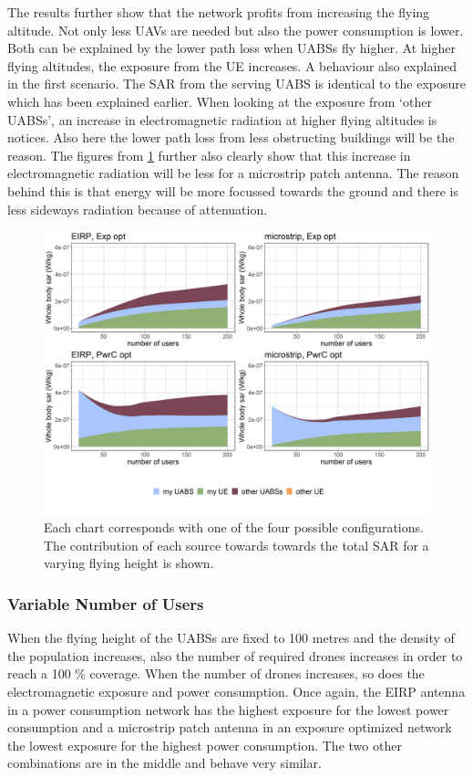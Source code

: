 \documentclass[twocolumn]{phdsymp} %
\begin{document}
The results further show that the network profits from increasing the flying altitude. Not only
less \gls{UAV}s are needed but also the power consumption is lower. Both can be explained by the
lower path loss when UABSs fly higher. At higher flying altitudes, 
the exposure from the \gls{UE} increases. A behaviour also explained in the first scenario.
The SAR from the serving \gls{UABS} is identical to the exposure which has been explained earlier.
When looking at the exposure from `other \gls{UABS}s', an increase in electromagnetic radiation at higher 
flying altitudes is notices.
Also here the lower path loss from less obstructing buildings will be the reason.
The figures from \ref{fig:s3a_fourSourcesMatrix} further also clearly show that this increase 
in electromagnetic radiation will be less for a microstrip patch antenna. The reason behind this is that energy 
will be more focussed towards the ground and there is less sideways radiation because of attenuation.

\begin{figure}[h!]
  \includegraphics[width=\linewidth]{../results/s3/fhFourSources.png}
  \caption{Each chart corresponds with one of the four possible configurations. The contribution of each source towards towards the total 
  \gls{SAR} for a varying flying height is shown.}
  \label{fig:s3a_fourSourcesMatrix}
\end{figure}

\subsubsection{Variable Number of Users}
When the flying height of the \gls{UABS}s are fixed to 100 metres and the density of the population increases, also 
the number of required drones increases in order to reach a 100 \% coverage. When the number of drones increases, 
so does the electromagnetic exposure and power consumption.
Once again, the EIRP antenna in a power consumption network has the highest exposure for the lowest power consumption
and a microstrip patch antenna in an exposure optimized network the lowest exposure for the highest power consumption.
The two other combinations are in the middle and behave very similar.
\end{document}
